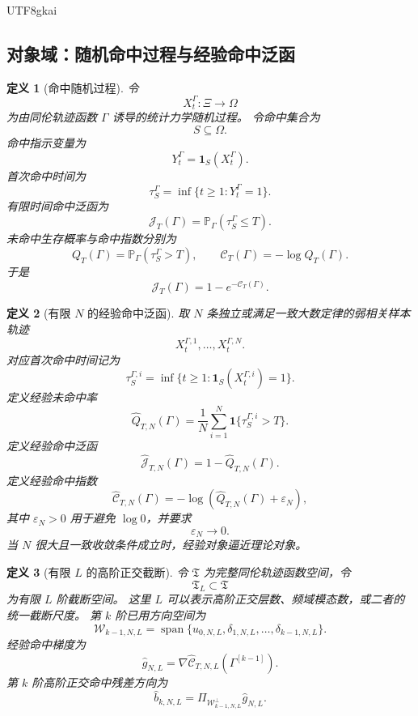 \documentclass[12pt]{article}
\newtheorem{definition}{定义}[section]
\begin{document}
\begin{CJK*}{UTF8}{gkai}
\subsection{对象域：随机命中过程与经验命中泛函}
\label{subsec:tex55-engdet-objects}

\begin{definition}[命中随机过程]
\label{def:tex55-engdet-hit-process}
令
\[
  X_t^\Gamma:\Xi\to\Omega
\]
为由同伦轨迹函数 \(\Gamma\) 诱导的统计力学随机过程。
令命中集合为
\[
  S\subseteq\Omega.
\]
命中指示变量为
\[
  Y_t^\Gamma=\mathbf 1_S(X_t^\Gamma).
\]
首次命中时间为
\[
  \tau_S^\Gamma
  =
  \inf\{t\ge1:Y_t^\Gamma=1\}.
\]
有限时间命中泛函为
\[
  \mathcal J_T(\Gamma)
  =
  \mathbb P_\Gamma(\tau_S^\Gamma\le T).
\]
未命中生存概率与命中指数分别为
\[
  Q_T(\Gamma)
  =
  \mathbb P_\Gamma(\tau_S^\Gamma>T),
  \qquad
  \mathcal C_T(\Gamma)
  =
  -\log Q_T(\Gamma).
\]
于是
\[
  \mathcal J_T(\Gamma)
  =
  1-e^{-\mathcal C_T(\Gamma)}.
\]
\end{definition}

\begin{definition}[有限 \(N\) 的经验命中泛函]
\label{def:tex55-engdet-empirical-functional}
取 \(N\) 条独立或满足一致大数定律的弱相关样本轨迹
\[
  X_t^{\Gamma,1},\ldots,X_t^{\Gamma,N}.
\]
对应首次命中时间记为
\[
  \tau_S^{\Gamma,i}
  =
  \inf\{t\ge1:\mathbf 1_S(X_t^{\Gamma,i})=1\}.
\]
定义经验未命中率
\[
  \widehat Q_{T,N}(\Gamma)
  =
  \frac1N
  \sum_{i=1}^{N}
  \mathbf 1\{\tau_S^{\Gamma,i}>T\}.
\]
定义经验命中泛函
\[
  \widehat{\mathcal J}_{T,N}(\Gamma)
  =
  1-\widehat Q_{T,N}(\Gamma).
\]
定义经验命中指数
\[
  \widehat{\mathcal C}_{T,N}(\Gamma)
  =
  -\log\left(\widehat Q_{T,N}(\Gamma)+\varepsilon_N\right),
\]
其中 \(\varepsilon_N>0\) 用于避免 \(\log 0\)，并要求
\[
  \varepsilon_N\to0.
\]
当 \(N\) 很大且一致收敛条件成立时，经验对象逼近理论对象。
\end{definition}

\begin{definition}[有限 \(L\) 的高阶正交截断]
\label{def:tex55-engdet-L-truncation}
令 \(\mathfrak T\) 为完整同伦轨迹函数空间，令
\[
  \mathfrak T_L\subset\mathfrak T
\]
为有限 \(L\) 阶截断空间。
这里 \(L\) 可以表示高阶正交层数、频域模态数，或二者的统一截断尺度。
第 \(k\) 阶已用方向空间为
\[
  \mathcal W_{k-1,N,L}
  =
  \operatorname{span}\{
  u_{0,N,L},
  \delta_{1,N,L},
  \ldots,
  \delta_{k-1,N,L}
  \}.
\]
经验命中梯度为
\[
  \widehat g_{N,L}
  =
  \nabla
  \widehat{\mathcal C}_{T,N,L}
  (\Gamma^{[k-1]}).
\]
第 \(k\) 阶高阶正交命中残差方向为
\[
  \widehat b_{k,N,L}
  =
  \Pi_{\mathcal W_{k-1,N,L}^{\perp}}
  \widehat g_{N,L}.
\]
\end{definition}


\end{CJK*}
\end{document}
